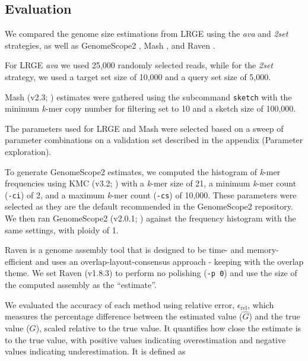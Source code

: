 \documentclass[unnumsec,webpdf,modern,large]{oup-authoring-template}
\theoremstyle{thmstyleone}%
\theoremstyle{thmstyletwo}%
\theoremstyle{thmstylethree}%
\newcommand{\lrge}{LRGE}
\newcommand{\relerr}{$\epsilon_{\text{rel}}$}
\newcommand{\ava}{\textit{ava}}
\newcommand{\twoset}{\textit{2set}}
\newcommand{\kmer}{\textit{k}-mer}
\begin{document}


\subsection{Evaluation}
\label{sec:eval}

We compared the genome size estimations from \lrge{} using the \ava{} and \twoset{} strategies, 
as well as GenomeScope2 \citep{ranallo-benavidez_genomescope_2020}, Mash \citep{ondov_mash_2016}, and Raven \citep{vaser_time-_2021}.

For \lrge{} \ava{} we used 25,000 randomly selected reads, while for the \twoset{} strategy, 
we used a target set size of 10,000 and a query set size of 5,000.

Mash (v2.3; \citep{ondov_mash_2016}) estimates were gathered using the subcommand \texttt{sketch} with the minimum \kmer{} copy number for filtering set to 10 and a sketch size of 100,000.

The parameters used for \lrge{} and Mash were selected based on a sweep of parameter combinations on a validation set described in the appendix (Parameter exploration).

To generate GenomeScope2 estimates, we computed the histogram of \kmer{} frequencies using 
KMC (v3.2; \citep{kokot_kmc_2017}) with a \kmer{} size of 21, a minimum \kmer{} count (\texttt{-ci}) of 2, and a maximum \kmer{} count (\texttt{-cs}) of 10,000. These parameters were selected as they are the default recommended in the GenomeScope2 repository. We then ran GenomeScope2 (v2.0.1; \citep{ranallo-benavidez_genomescope_2020}) against the frequency histogram with the same settings, with ploidy of 1.

Raven is a genome assembly tool that is designed to be time- and memory-efficient and uses an overlap-layout-consensus approach \citep{vaser_time-_2021} - keeping with the overlap theme. We set Raven (v1.8.3) to perform no polishing (\verb|-p 0|) and use the size of the computed assembly as the \enquote{estimate}.

We evaluated the accuracy of each method using relative error, \relerr{}, which measures the percentage difference between the estimated value ($\hat{G}$) and the true value ($G$), scaled relative to the true value. It quantifies how close the estimate is to the true value, with positive values indicating overestimation and negative values indicating underestimation. It is defined as
\end{document}

